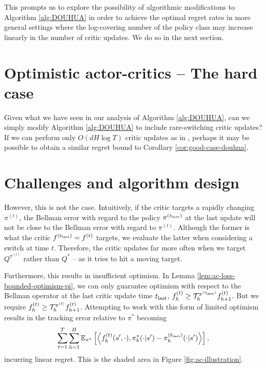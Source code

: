 This prompts us to explore the possibility of algorithmic modifications to Algorithm \ref{alg:DOUHUA} in order to achieve the optimal regret rates in more general settings where the log-covering number of the policy class may increase linearly in the number of critic updates. We do so in the next section.

\section{Optimistic actor-critics -- The hard case}
\label{sec:nora-hard}

Given what we have seen in our analysis of Algorithm \ref{alg:DOUHUA}, can we simply modify Algorithm \ref{alg:DOUHUA} to include rare-switching critic updates? If we can perform only $O(dH\log T)$ critic updates as in \cite{xiong2023generalframeworksequentialdecisionmaking}, perhaps it may be possible to obtain a similar regret bound to Corollary \ref{cor:good-case-douhua}. 

\section{Challenges and algorithm design} 



However, this is not the case. Intuitively, if the critic targets a rapidly changing $\pi^{(t)}$, the Bellman error with regard to the policy $\pi^{(t_{\text{last}})}$ at the last update will not be close to the Bellman error with regard to $\pi^{(t)}$. Although the former is what the critic $f^{(t_{\text{last}})}=f^{(t)}$ targets, we evaluate the latter when considering a switch at time $t$. Therefore, the critic updates far more often when we target $Q^{\pi^{(t)}}$ rather than $Q^*$ -- as it tries to hit a moving target. 

Furthermore, this results in insufficient optimism. In Lemma \ref{lem:ac-loss-bounded-optimism-pi}, we can only guarantee optimism with respect to the Bellman operator at the last critic update time $t_{\text{last}}$, $f_h^{(t)} \geq {\mathcal{T}}_h^{\pi^{(t_{\text{last}})}}f_{h+1}^{(t)}$. But we require $f_h^{(t)} \geq {\mathcal{T}}_h^{\pi^{(t)}}f_{h+1}^{(t)}$. Attempting to work with this form of limited optimism results in the tracking error relative to $\pi^*$ becoming
$$\sum_{t=1}^T\sum_{h=1}^H \mathbb{E}_{\pi^*}\left[\left\langle f_h^{(t)}(s',\cdot), \pi_h^*(\cdot | s') - \pi_h^{(t_{\text{last}})}(\cdot | s')\right\rangle\right],$$
incurring linear regret. This is the shaded area in Figure \ref{fig:ac-illustration}.

